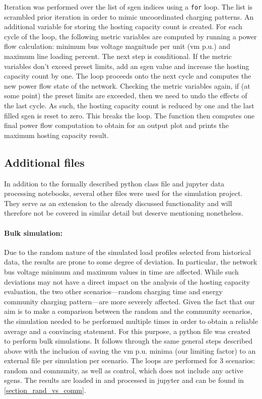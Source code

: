 \documentclass[a4paper,10pt]{report}
\begin{document}
Iteration was performed over the list of sgen indices using a \texttt{for} loop. The list is scrambled prior iteration in order to mimic uncoordinated charging patterns. An additional variable for storing the hosting capacity count is created. For each cycle of the loop, the following metric variables are computed by running a power flow calculation: minimum bus voltage magnitude per unit (vm p.u.) and maximum line loading percent. The next step is conditional. If the metric variables don't exceed preset limits, add an sgen value and increase the hosting capacity count by one. The loop proceeds onto the next cycle and computes the new power flow state of the network. Checking the metric variables again, if (at some point) the preset limits are exceeded, then we need to undo the effects of the last cycle. As such, the hosting capacity count is reduced by one and the last filled sgen is reset to zero. This breaks the loop. The function then computes one final power flow computation to obtain for an output plot and prints the maximum hosting capacity result.

\subsection{Additional files}\label{subsection_additional}
In addition to the formally described python class file and jupyter data processing notebooks, several other files were used for the simulation project. They serve as an extension to the already discussed functionality and will therefore not be covered in similar detail but deserve mentioning nonetheless.

\paragraph{Bulk simulation:} Due to the random nature of the simulated load profiles selected from historical data, the results are prone to some degree of deviation. In particular, the network bus voltage minimum and maximum values in time are affected. While such deviations may not have a direct impact on the analysis of the hosting capacity evaluation, the two other scenarios---random charging time and energy community charging pattern---are more severely affected. Given the fact that our aim is to make a comparison between the random and the community scenarios, the simulation needed to be performed multiple times in order to obtain a reliable average and a convincing statement. For this purpose, a python file was created to perform bulk simulations. It follows through the same general steps described above with the inclusion of saving the vm p.u. minima (our limiting factor) to an external file per simulation per scenario. The loops are performed for 3 scenarios: random and community, as well as control, which does not include any active sgens. The results are loaded in and processed in jupyter and can be found in \cref{section_rand_vs_comm}.
\end{document}
